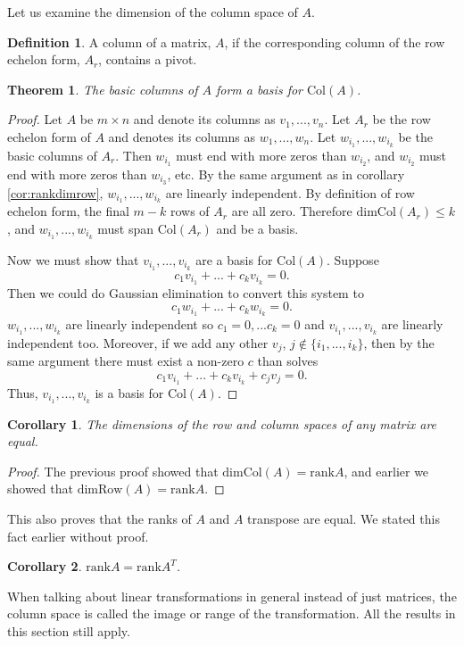 \documentclass[12pt,reqno]{amsart}
\newtheorem{theorem}{Theorem}[section]
\newtheorem{corollary}{Corollary}[section]
\theoremstyle{definition}
\newtheorem{definition}{Definition}[section]
\newcommand{\rank}{\mathrm{rank}}
\newcommand{\row}{\mathrm{Row}}
\newcommand{\col}{\mathrm{Col}}
\renewcommand{\dim}{\mathrm{dim}}
\begin{document}
Let us examine the dimension of the column space of $A$.
\begin{definition}
  A column of a matrix, $A$, if the corresponding column of the row
  echelon form, $A_r$, contains a pivot. 
\end{definition}
\begin{theorem}
  The basic columns of $A$ form a basis for $\col(A)$. 
\end{theorem}
\begin{proof}
  Let $A$ be $m \times n$ and denote its columns as $v_1,...,v_n$. Let
  $A_r$ be the row echelon form of $A$ and denotes its columns as
  $w_1,...,w_n$. Let $w_{i_1}, ..., w_{i_k}$ be the basic columns of
  $A_r$. Then $w_{i_1}$ must end with more zeros than $w_{i_2}$, and
  $w_{i_2}$ must end with more zeros than $w_{i_3}$, etc. By the same
  argument as in corollary \ref{cor:rankdimrow}, $w_{i_1},...,w_{i_k}$
  are linearly independent. By definition of row echelon form, the
  final $m-k$ rows of $A_r$ are all zero. Therefore $\dim \col(A_r) \leq
  k$, and $w_{i_1},...,w_{i_k}$ must span $\col(A_r)$ and be a basis. 

  Now we must show that $v_{i_1}, ..., v_{i_k}$ are a basis for
  $\col(A)$. Suppose
  \[ c_1 v_{i_1} + ... + c_k v_{i_k} = 0. \]
  Then we could do Gaussian elimination to convert this system to
  \[ c_1 w_{i_1} + ... + c_k w_{i_k} = 0. \]
  $w_{i_1},... , w_{i_k}$ are linearly independent so $c_1 = 0
  ,... c_k = 0$ and $v_{i_1}, ..., v_{i_k}$ are linearly independent
  too. Moreover, if we add any other $v_j$, $j \not\in \{i_1, ..., i_k\}$,
  then by the same argument there must exist a non-zero $c$ than
  solves 
  \[ c_1 v_{i_1} + ... + c_k v_{i_k} + c_j v_j = 0. \]
  Thus, $v_{i_1} , ..., v_{i_k}$ is a basis for $\col(A)$. 
\end{proof}
\begin{corollary}
  The dimensions of the row and column spaces of any matrix are
  equal. 
\end{corollary}
\begin{proof}
  The previous proof showed that $\dim \col(A) = \rank A$, and earlier
  we showed that $\dim \row(A) = \rank A$. 
\end{proof}
This also proves that the ranks of $A$ and $A$ transpose are equal. We
stated this fact earlier without proof.
\begin{corollary}
  $\rank A = \rank A^T$.
\end{corollary}
When talking about linear transformations in general instead of just
matrices, the column space is called the image or range of the
transformation. All the results in this section still apply. 
\end{document}
